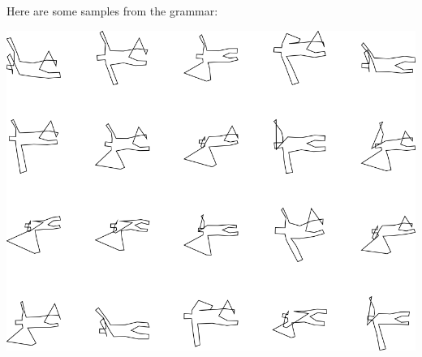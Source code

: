 Here are some samples from the grammar:

\includegraphics[width=6in]{output/3.learning/incremental/gram.13.d/samples.png}

